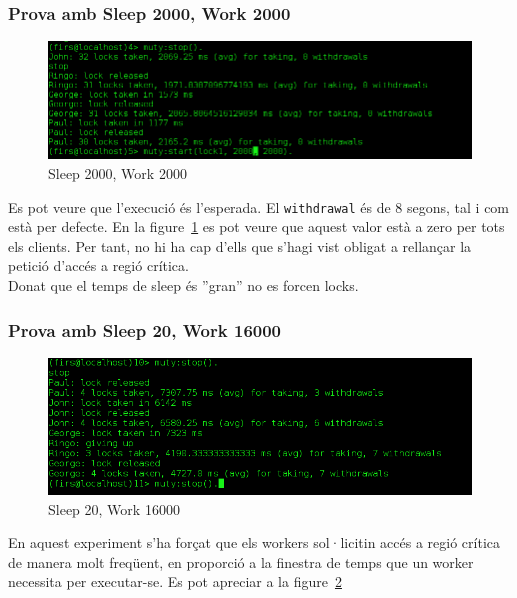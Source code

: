 \documentclass[a4paper, 11pt]{article}
\begin{document}
\subsubsection{Prova amb Sleep 2000, Work 2000}

\begin{figure}[H]
	\centering
    \includegraphics[width=1.0\textwidth]{figures/2000-2000lock1}
    \caption{Sleep 2000, Work 2000 \label{fig:2000-2000lock1}}    
\end{figure}


Es pot veure que l'execució és l'esperada. El \texttt{withdrawal} és de 8 segons, tal i com està per defecte. En la figure~\ref{fig:2000-2000lock1} es pot veure que aquest valor està a zero per tots els clients. Per tant, no hi ha cap d'ells que s'hagi vist obligat a rellançar la petició d'accés a regió crítica. \\ 
Donat que el temps de sleep és ''gran'' no es forcen locks. 

\subsubsection{Prova amb Sleep 20, Work 16000}

\begin{figure}[H]
	\centering
    \includegraphics[width=1.0\textwidth]{figures/20-16000lock1}
    \caption{Sleep 20, Work 16000 \label{fig:20-16000lock1}}    
\end{figure}

En aquest experiment s'ha forçat que els workers sol·licitin accés a regió crítica de manera molt freqüent, en proporció a la finestra de temps que un worker necessita per executar-se.  
Es pot apreciar a la figure~\ref{fig:20-16000lock1} 
\end{document}
